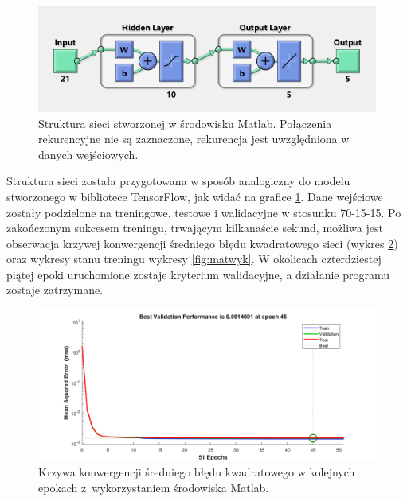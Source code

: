 \documentclass[12pt, a4paper]{article}
\begin{document}
 \begin{figure}[ht]
    \centering
    \includegraphics[width=1\textwidth]{siecmatlab}
    \caption{Struktura sieci stworzonej w środowisku Matlab. Połączenia rekurencyjne nie są zaznaczone, rekurencja jest uwzględniona w danych wejściowych.}
    \label{fig:siecmatlab}
\end{figure}

Struktura sieci została przygotowana w sposób analogiczny do modelu stworzonego w bibliotece TensorFlow, jak widać na grafice \ref{fig:siecmatlab}. Dane wejściowe zostały podzielone na treningowe, testowe i walidacyjne w stosunku 70-15-15. Po zakończonym sukcesem treningu, trwającym kilkanaście sekund, możliwa jest obserwacja krzywej konwergencji średniego błędu kwadratowego sieci (wykres \ref{fig:matper}) oraz wykresy stanu treningu wykresy \ref{fig:matwyk}. W okolicach czterdziestej piątej epoki uruchomione zostaje kryterium walidacyjne, a działanie programu zostaje zatrzymane.


 \begin{figure}[H]
    \centering
    \includegraphics[width=1\textwidth]{performance}
    \caption{Krzywa konwergencji średniego błędu kwadratowego w kolejnych epokach z~wykorzystaniem środowiska Matlab.}
    \label{fig:matper}
\end{figure}
\end{document}
